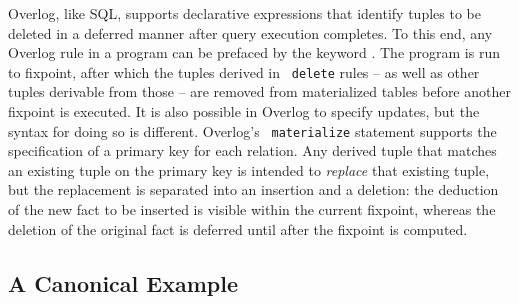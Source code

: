 Overlog, like SQL, supports declarative
expressions that identify tuples to be deleted in a deferred manner
after query execution completes.  To this end, any Overlog rule in a
program can be prefaced by the keyword .  The program is run to fixpoint, after which the tuples derived in  {\tt
  delete} rules -- as well as other tuples derivable from those -- are removed
from materialized tables before another
fixpoint is executed. It is also possible in Overlog to specify
updates, but the syntax for doing so is different.  Overlog's {\tt
  materialize} statement supports the specification of a primary key for
each relation.  Any derived tuple that matches an existing tuple on the
primary key is intended to {\em replace} that existing tuple, but
the replacement is separated into an insertion and a deletion: the
deduction of the new fact to be inserted is visible within the current
fixpoint, whereas the deletion of the original fact is deferred until
after the fixpoint is computed.

    \subsection{A Canonical Example}
        \label{sec:declnet}


